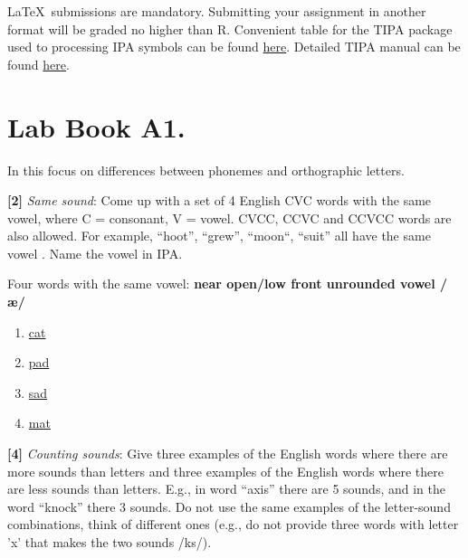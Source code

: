 \documentclass{../labbook}
\begin{document}
\begin{mdframed}[backgroundcolor=blue!20]
\LaTeX ~submissions are mandatory. Submitting your assignment in another format will be graded no higher than R. Convenient table for the TIPA package used to processing IPA symbols can be found \href{https://jon.dehdari.org/tutorials/tipachart_mod.pdf}{here}. Detailed TIPA manual can be found \href{http://www.l.u-tokyo.ac.jp/~fkr/tipa/tipaman.pdf}{here}.
\end{mdframed}

\tableofcontents %

\section{Lab Book A1.}
In this focus on differences between phonemes and orthographic letters. 

\begin{problem}{1}
\textbf{[2]} \textit{Same sound}: Come up with a set of 4 English CVC words with the same vowel, where C = consonant, V = vowel. CVCC, CCVC and CCVCC words are also allowed. For example, “hoot”, “grew”, “moon“, “suit” all have the same vowel . Name the vowel in IPA.
\end{problem}

\begin{solution}
Four words with the same vowel: \textbf{near open/low front unrounded vowel /\ae/}
\begin{enumerate}
    \item \underline{cat}
    \item \underline{pad}
    \item \underline{sad}
    \item \underline{mat}
\end{enumerate}


\end{solution}
\begin{problem}{2}
\textbf{[4]} \textit{Counting sounds}: Give three examples of the English words where there are more sounds than letters and three examples of the English words where there are less sounds than letters.
E.g., in word ``axis'' there are 5 sounds, and in the word ``knock'' there 3 sounds.  Do not use the same examples of the letter-sound combinations, think of different ones (e.g., do not provide three words with letter 'x' that makes the two sounds /ks/). 
\end{problem}
\end{document}
